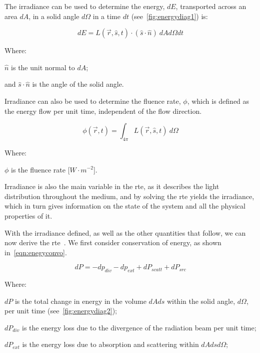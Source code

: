 The irradiance can be used to determine the energy, $dE$, transported across an area $dA$, in a solid angle $d\Omega$ in a time $dt$ (see~\cref{fig:energydiag1}) is:

\begin{equation}
	dE = L(\vec{r},\hat{s},t) \cdot (\hat{s} \cdot \hat{n})\ dAd\Omega dt
\end{equation}

\noindent Where:

\indent $\hat{n}$ is the unit normal to $dA$;

\indent and $\hat{s}\cdot\hat{n}$ is the angle of the solid angle.

\medskip

Irradiance can also be used to determine the fluence rate, $\phi$, which is defined as the energy flow per unit time, independent of the flow direction.

\begin{equation}
	\phi(\vec{r},t)=\int_{4\pi}L(\vec{r},\hat{s},t)\ d\Omega
\end{equation}

\noindent Where:

\indent $\phi$ is the fluence rate [$W \cdot m^{-2}$].

\medskip

Irradiance is also the main variable in the \gls{rte}, as it describes the light distribution throughout the medium, and by solving the \gls{rte} yields the irradiance, which in turn gives information on the state of the system and all the physical properties of it.

With the irradiance defined, as well as the other quantities that follow, we can now derive the \gls{rte}~\cite{chandrasekhar2013radiative,wang2012biomedical}. We first consider conservation of energy, as shown in~\cref{eqn:enegyconvo}.

\begin{equation}
	dP = -dp_{div} - dp_{ext} + dP_{scatt} + dP_{src}
	\label{eqn:enegyconvo}
\end{equation}

\noindent Where:

\indent $dP$ is the total change in energy in the volume $dAds$ within the solid angle, $d\Omega$, per unit time (see~\cref{fig:energydiag2});

\indent $dP_{div}$ is the energy loss due to the divergence of the radiation beam per unit time;

\indent $dP_{ext}$ is the energy loss due to absorption and scattering within $dAdsd\Omega$;

